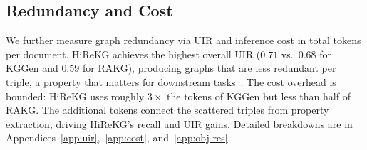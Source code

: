\documentclass[11pt]{article}
\begin{document}

\subsection{Redundancy and Cost}
\label{sec:cost-redundancy}
We further measure graph redundancy via UIR and inference cost in total tokens per document. HiReKG achieves the highest overall UIR ($0.71$ vs.\ $0.68$ for KGGen and $0.59$ for RAKG), producing graphs that are less redundant per triple, a property that matters for downstream tasks~\citep{redundanyinkg}. The cost overhead is bounded: HiReKG uses roughly $3\times$ the tokens of KGGen but less than half of RAKG. The additional tokens connect the scattered triples from property extraction, driving HiReKG's recall and UIR gains. Detailed breakdowns are in Appendices~\ref{app:uir},~\ref{app:cost}, and~\ref{app:obj-res}.
\end{document}
